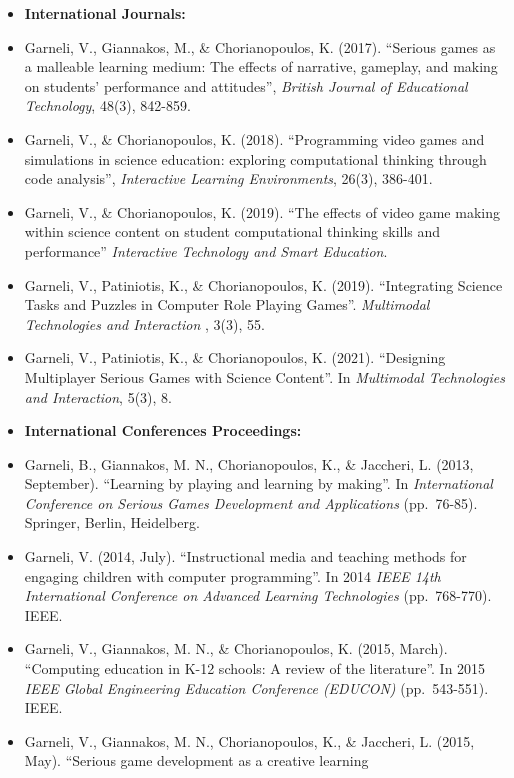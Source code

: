 \documentclass[%
    11pt,
  oneside
  ]{memoir}
\begin{document}
\begin{itemize}
\tightlist
\item
  \textbf{International Journals:}
\item
  Garneli, V., Giannakos, M., \& Chorianopoulos, K. (2017). ``Serious
  games as a malleable learning medium: The effects of narrative,
  gameplay, and making on students' performance and attitudes'',
  \emph{British Journal of Educational Technology}, 48(3), 842-859.
\item
  Garneli, V., \& Chorianopoulos, K. (2018). ``Programming video games
  and simulations in science education: exploring computational thinking
  through code analysis'', \emph{Interactive Learning Environments},
  26(3), 386-401.
\item
  Garneli, V., \& Chorianopoulos, K. (2019). ``The effects of video game
  making within science content on student computational thinking skills
  and performance'' \emph{Interactive Technology and Smart Education}.
\item
  Garneli, V., Patiniotis, K., \& Chorianopoulos, K. (2019).
  ``Integrating Science Tasks and Puzzles in Computer Role Playing
  Games''. \emph{Multimodal Technologies and Interaction} , 3(3), 55.
\item
  Garneli, V., Patiniotis, K., \& Chorianopoulos, K. (2021). ``Designing
  Multiplayer Serious Games with Science Content''. In \emph{Multimodal
  Technologies and Interaction}, 5(3), 8.
\item
  \textbf{International Conferences Proceedings:}
\item
  Garneli, B., Giannakos, M. N., Chorianopoulos, K., \& Jaccheri, L.
  (2013, September). ``Learning by playing and learning by making''. In
  \emph{International Conference on Serious Games Development and
  Applications} (pp.~76-85). Springer, Berlin, Heidelberg.
\item
  Garneli, V. (2014, July). ``Instructional media and teaching methods
  for engaging children with computer programming''. In 2014 \emph{IEEE
  14th International Conference on Advanced Learning Technologies}
  (pp.~768-770). IEEE.
\item
  Garneli, V., Giannakos, M. N., \& Chorianopoulos, K. (2015, March).
  ``Computing education in K-12 schools: A review of the literature''.
  In 2015 \emph{IEEE Global Engineering Education Conference (EDUCON)}
  (pp.~543-551). IEEE.
\item
  Garneli, V., Giannakos, M. N., Chorianopoulos, K., \& Jaccheri, L.
  (2015, May). ``Serious game development as a creative learning

\end{itemize}
\end{document}
